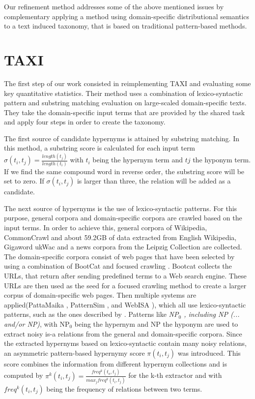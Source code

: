 \documentclass[12pt, headsepline, a4paper]{scrartcl}
\begin{document}
Our refinement method addresses some of the above mentioned issues by complementary applying a method using domain-specific distributional semantics to a text induced taxonomy, that is based on traditional pattern-based methods. 


\section{TAXI}

\label{TAXI}

The first step of our work consisted in reimplementing TAXI and evaluating some key quantitative statistics. Their method uses a combination of lexico-syntactic pattern and substring matching evaluation on large-scaled domain-specific texts. They take the domain-specific input terms that are provided by the shared task and apply four steps in order to create the taxonomy. 

The first source of candidate hypernyms is attained by substring matching. In this method, a substring score is calculated for each input term $\sigma(t_i, t_j) = \frac{length(t_j)}{length(t_i)}$ with $t_i$ being the hypernym term and $tj$ the hyponym term. If we find the same compound word in reverse order, the substring score will be set to zero.  If $\sigma(t_i, t_j)$ is larger than three, the relation will be added as a candidate. 

The next source of hypernyms is the use of lexico-syntactic patterns. For this purpose, general corpora and domain-specific corpora are crawled based on the input terms.  In order to achieve this, general corpora of Wikipedia, CommonCrawl and about 59.2GB of data extracted from English Wikipedia, Gigaword \citep{parker} ukWac \citep{Ferraresi} and a news corpora from the Leipzig Collection \citep{goldhahn} are collected. The domain-specific corpora consist of web pages that have been selected by using a combination of BootCat and focused crawling \citep{remus2016domain}. Bootcat collects the URLs, that return after sending predefined terms to a Web search engine. These URLs are then used as the seed for a focused crawling method to create a larger corpus of domain-specific web pages. 
Then multiple systems are applied(PattaMaika \citep{kluegl2016uima}, PatternSim \citep{konvens:23_panchenko12p}, and \mbox{WebISA} \citep{Seitner2016ALD}), which all use lexico-syntactic patterns, such as the ones described by \cite{Hearst:1992:AAH:992133.992154}. Patterns like \emph{NP$_0$ , including NP (... and/or NP)}, with NP$_0$ being the hypernym and NP the hyponym are used to extract noisy is-a relations from the general and domain-specific corpora. Since the extracted hypernyms based on lexico-syntactic contain many noisy relations, an asymmetric pattern-based hypernymy score $\pi(t_i, t_j)$ was introduced. This score combines the information  from different hypernym collections and is computed by $\pi^k(t_i, t_j) = \frac{freq^k(t_o, t_j)}{max_jfreq^k(t_i, t_j)}$ for the k-th extractor and with $freq^k(t_i,t_j)$ being the frequency of relations between two terms.
\end{document}
